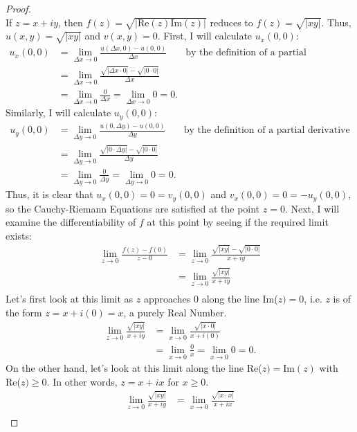 \documentclass[10pt,a4paper]{article}
\begin{document}
\begin{proof}{$ $}
\\If $z = x + iy$, then $f(z) = \sqrt{|\text{Re}(z)\text{Im}(z)|}$ reduces to $f(z) = \sqrt{|xy|}$. Thus, $u(x,y) = \sqrt{|xy|}$ and $v(x,y) = 0$. First, I will calculate $u_x(0,0)$:
\begin{align*}
u_x(0,0) &= \lim_{\Delta x \to 0}\frac{u(\Delta x,0) - u(0,0)}{\Delta x} &\text{by the definition of a partial derivative}\\
&= \lim_{\Delta x \to 0}\frac{\sqrt{|\Delta x \cdot 0|} - \sqrt{|0\cdot 0|}}{\Delta x}\\
&= \lim_{\Delta x \to 0}\frac{0}{\Delta x} = \lim_{\Delta x \to 0} 0 = 0.
\end{align*}
Similarly, I will calculate $u_y(0,0)$:
\begin{align*}
u_y(0,0) &= \lim_{\Delta y \to 0}\frac{u(0, \Delta y) - u(0,0)}{\Delta y} &\text{by the definition of a partial derivative}\\
&= \lim_{\Delta y \to 0}\frac{\sqrt{|0 \cdot \Delta y|} - \sqrt{|0\cdot 0|}}{\Delta y}\\
&= \lim_{\Delta y \to 0}\frac{0}{\Delta y} = \lim_{\Delta y \to 0} 0 = 0.
\end{align*}
Thus, it is clear that $u_x(0,0) = 0 = v_y(0,0)$ and $v_x(0,0) = 0 = -u_y(0,0)$, so the Cauchy-Riemann Equations are satisfied at the point $z = 0$. Next, I will examine the differentiability of $f$ at this point by seeing if the required limit exists:
\begin{align*}
\lim_{z \to 0}\frac{f(z) - f(0)}{z - 0} &= \lim_{z \to 0}\frac{\sqrt{|xy|} - \sqrt{|0 \cdot 0|}}{x + iy}\\
&= \lim_{z \to 0}\frac{\sqrt{|xy|}}{x + iy}\\
\end{align*}
Let's first look at this limit as $z$ approaches 0 along the line Im($z) = 0$, i.e. $z$ is of the form $z = x + i(0) = x$, a purely Real Number.
\begin{align*}
\lim_{z \to 0}\frac{\sqrt{|xy|}}{x + iy} &= \lim_{x \to 0}\frac{\sqrt{|x \cdot 0|}}{x + i(0)}\\
&= \lim_{x \to 0}\frac{0}{x} = \lim_{x \to 0} 0 = 0.
\end{align*}
On the other hand, let's look at this limit along the line Re($z) = \text{Im}(z)$ with Re($z) \geq 0$. In other words, $z = x + ix$ for $x \geq 0$. 
\begin{align*}
\lim_{z \to 0}\frac{\sqrt{|xy|}}{x + iy} &= \lim_{x \to 0}\frac{\sqrt{|x \cdot x|}}{x + ix}\\

\end{align*}
\end{proof}
\end{document}
